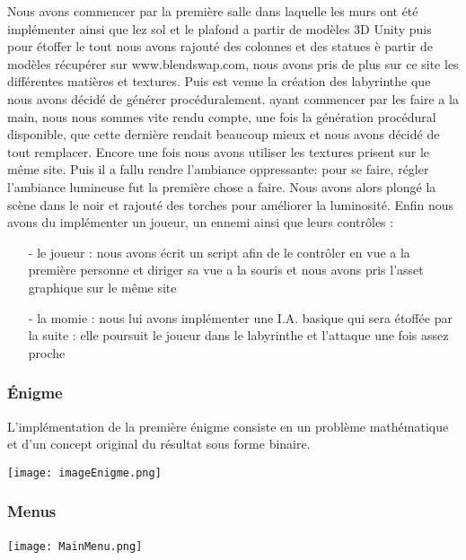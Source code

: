 \documentclass[12pt,a4paper]{article}
\begin{document}
Nous avons commencer par la première salle dans laquelle les murs ont été implémenter ainsi que lez sol et le plafond a partir de modèles 3D Unity puis pour étoffer le tout nous avons rajouté des colonnes et des statues è partir de modèles récupérer sur www.blendswap.com, nous avons pris de plus sur ce site les différentes matières et textures. Puis est venue la création des labyrinthe que nous avons décidé de générer procéduralement. ayant commencer par les faire a la main, nous nous sommes vite rendu compte, une fois la génération procédural disponible, que cette dernière rendait beaucoup mieux et nous avons décidé de tout remplacer. Encore une fois nous avons utiliser les textures prisent sur le même site.
Puis il a fallu rendre l'ambiance oppressante: pour se faire, régler l'ambiance lumineuse fut la première chose a faire. Nous avons alors plongé la scène dans le noir et rajouté des torches pour améliorer la luminosité.
Enfin nous avons du implémenter un joueur, un ennemi ainsi que leurs contrôles :
\begin{itemize}
\item[-] le joueur : nous avons écrit un script afin de le contrôler en vue a la première personne et diriger sa vue a la souris et nous avons pris l'asset graphique sur le même site
\item[-] la momie : nous lui avons implémenter une I.A. basique qui sera étoffée par la suite : elle poursuit le joueur dans le labyrinthe et l'attaque une fois assez proche
\end{itemize} 

\subsubsection{Énigme}
L'implémentation de la première énigme consiste en un problème mathématique et d'un concept original du résultat sous forme binaire.
\begin{center}
\texttt{[image: imageEnigme.png]}
\end{center}



\newpage
\subsubsection{Menus}

\paragraph{}
\begin{center}
\texttt{[image: MainMenu.png]}
\end{center}
\end{document}
